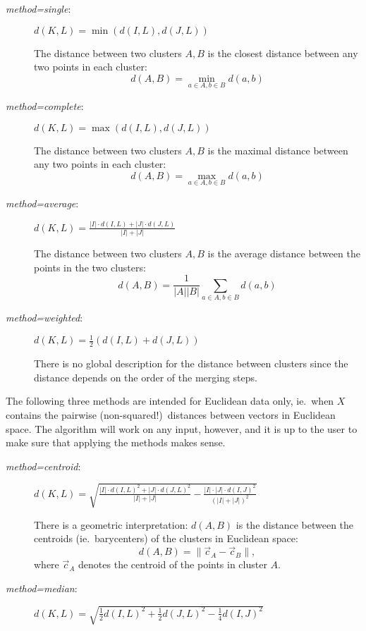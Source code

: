 \documentclass[fontsize=10pt,paper=letter,BCOR=-6mm,DIV=8]{scrartcl}
\makeatletter
\newcommand*\q{\textquotesingle}
\newenvironment{methods}{%
  \list{}{\labelwidth\z@
    \itemindent-\leftmargin
    \let\makelabel\methodslabel}%
}{%
  \endlist
}
\newcommand*{\methodslabel}[1]{%
  \hbox to \textwidth{\hspace{\labelsep}%
  \normalfont\bfseries\ttfamily
  #1\hskip-\labelsep\hfill}%
}
\makeatother
\begin{document}
\begin{methods}
\begin{description}
\item [\normalfont\textit{method=\q single\q}:]
$\displaystyle d(K,L) = \min(d(I,L), d(J,L))$

The distance between two clusters $A,B$ is the closest distance between any two points in each cluster:
\[
 d(A,B)=\min_{a\in A, b\in B}d(a,b)
\]

\item [\normalfont\textit{method=\q complete\q}:]
$\displaystyle d(K,L) = \max(d(I,L), d(J,L))$

The distance between two clusters $A,B$ is the maximal distance between any two points in each cluster:
\[
 d(A,B)=\max_{a\in A, b\in B}d(a,b)
\]

\item [\normalfont\textit{method=\q average\q}:]
$\displaystyle d(K,L) = \frac{|I|\cdot d(I,L)+|J|\cdot d(J,L)}{|I|+|J|}$

The distance between two clusters $A,B$ is the average distance between the points in the two clusters:
\[
 d(A,B)=\frac1{|A||B|}\sum_{a\in A, b\in B}d(a,b)
\]

\item [\normalfont\textit{method=\q weighted\q}:]
$\displaystyle d(K,L) = \tfrac12(d(I,L)+d(J,L))$

There is no global description for the distance between clusters since the distance depends on the order of the merging steps.
\end{description}

The following three methods are intended for Euclidean data only, ie.\ when $X$ contains the pairwise (non-squared!)\ distances between vectors in Euclidean space. The algorithm will work on any input, however, and it is up to the user to make sure that applying the methods makes sense.

\begin{description}
\item [\normalfont\textit{method=\q centroid\q}:]
$\displaystyle d(K,L) = \sqrt{\frac{|I|\cdot d(I,L)^2+|J|\cdot d(J,L)^2}{|I|+|J|}-\frac{|I|\cdot|J|\cdot d(I,J)^2}{(|I|+|J|)^2}}$

There is a geometric interpretation: $d(A,B)$ is the distance between the centroids (ie.\ barycenters) of the clusters in Euclidean space:
\[
  d(A,B) = \|\vec c_A-\vec c_B\|,
\]
where $\vec c_A$ denotes the centroid of the points in cluster $A$.

\item [\normalfont\textit{method=\q median\q}:]
$\displaystyle d(K,L) = \sqrt{\tfrac12 d(I,L)^2+\tfrac12 d(J,L)^2-\tfrac14 d(I,J)^2}$


\end{description}
\end{methods}
\end{document}
